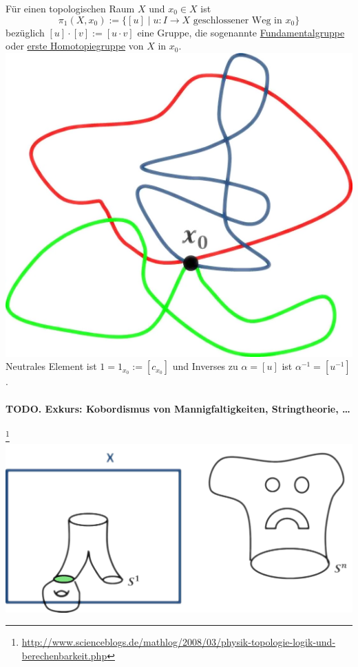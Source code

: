 \documentclass[a4paper,11pt,notitlepage]{report}
\theoremstyle{definition}
\begin{document}
\begin{theorem}{}
	Für einen topologischen Raum $X$ und $x_0 \in X$ ist 
	$$\pi_1 (X,x_0) := \{ [u] \mid u \colon I \rightarrow X \text{ geschlossener Weg in } x_0 \}$$
	bezüglich $[u] \cdot [v] := [u \cdot v]$ eine Gruppe, die sogenannte \underline{Fundamentalgruppe} oder \underline{erste Homotopiegruppe} von $X$ in $x_0$. \includegraphics[scale=0.4]{images/Fundamentalgruppe.png}
	\newline
	Neutrales Element ist $1 = 1_{x_0} := [c_{x_0}]$ \newline und Inverses zu $\alpha = [u]$ ist $\alpha^{-1} = [u^{-1}]$.
\end{theorem}

\paragraph{TODO. Exkurs: Kobordismus von Mannigfaltigkeiten, Stringtheorie, \ldots}\footnote{\url{http://www.scienceblogs.de/mathlog/2008/03/physik-topologie-logik-und-berechenbarkeit.php}} \includegraphics[scale=0.4]{images/Kobordismus.png} 
\end{document}
